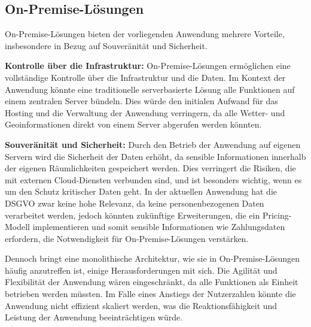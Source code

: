\subsection{On-Premise-Lösungen}

On-Premise-Lösungen bieten der vorliegenden Anwendung mehrere Vorteile, insbesondere in Bezug auf Souveränität und Sicherheit.

\textbf{Kontrolle über die Infrastruktur:} On-Premise-Lösungen ermöglichen eine vollständige Kontrolle über die Infrastruktur und die Daten. Im Kontext der Anwendung könnte eine traditionelle serverbasierte Lösung alle Funktionen auf einem zentralen Server bündeln. Dies würde den initialen Aufwand für das Hosting und die Verwaltung der Anwendung verringern, da alle Wetter- und Geoinformationen direkt von einem Server abgerufen werden könnten.

\textbf{Souveränität und Sicherheit:} Durch den Betrieb der Anwendung auf eigenen Servern wird die Sicherheit der Daten erhöht, da sensible Informationen innerhalb der eigenen Räumlichkeiten gespeichert werden. Dies verringert die Risiken, die mit externen Cloud-Diensten verbunden sind, und ist besonders wichtig, wenn es um den Schutz kritischer Daten geht. In der aktuellen Anwendung hat die DSGVO zwar keine hohe Relevanz, da keine personenbezogenen Daten verarbeitet werden, jedoch könnten zukünftige Erweiterungen, die ein Pricing-Modell implementieren und somit sensible Informationen wie Zahlungsdaten erfordern, die Notwendigkeit für On-Premise-Lösungen verstärken.

Dennoch bringt eine monolithische Architektur, wie sie in On-Premise-Lösungen häufig anzutreffen ist, einige Herausforderungen mit sich. Die Agilität und Flexibilität der Anwendung wären eingeschränkt, da alle Funktionen als Einheit betrieben werden müssten. Im Falle eines Anstiegs der Nutzerzahlen könnte die Anwendung nicht effizient skaliert werden, was die Reaktionsfähigkeit und Leistung der Anwendung beeinträchtigen würde.